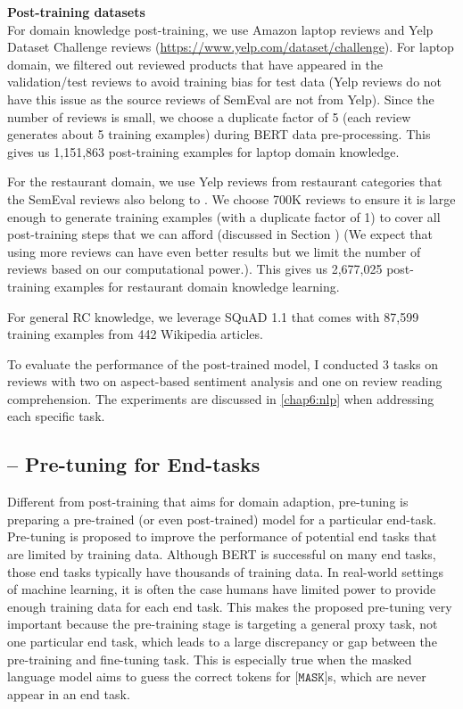 \textbf{Post-training datasets}\\
For domain knowledge post-training, we use Amazon laptop reviews \cite{HeMcA16a} and Yelp Dataset Challenge reviews (\url{https://www.yelp.com/dataset/challenge}).
For laptop domain, we filtered out reviewed products that have appeared in the validation/test reviews to avoid training bias for test data (Yelp reviews do not have this issue as the source reviews of SemEval are not from Yelp). 
Since the number of reviews is small, we choose a duplicate factor of 5 (each review generates about 5 training examples) during BERT data pre-processing.
This gives us 
1,151,863 post-training examples for laptop domain knowledge.

For the restaurant domain, we use Yelp reviews from restaurant categories that the SemEval reviews also belong to \cite{xu_acl2018}.
We choose 700K reviews to ensure it is large enough to generate training examples (with a duplicate factor of 1) to cover all post-training steps that we can afford (discussed in Section 
) (We expect that using more reviews can have even better results but we limit the number of reviews based on our computational power.).
This gives us 2,677,025 post-training examples for restaurant domain knowledge learning.

For general RC knowledge, we leverage SQuAD 1.1 \cite{rajpurkar2016squad} that comes with 87,599 training examples from 442 Wikipedia articles.

To evaluate the performance of the post-trained model, I conducted 3 tasks on reviews with two on aspect-based sentiment analysis and one on review reading comprehension.
The experiments are discussed in \ref{chap6:nlp} when addressing each specific task.

\subsection{-- Pre-tuning for End-tasks}
\label{chap4:sec:pre-tuning}

Different from post-training that aims for domain adaption, pre-tuning is preparing a pre-trained (or even post-trained) model for a particular end-task.
Pre-tuning is proposed to improve the performance of potential end tasks that are limited by training data.
Although BERT is successful on many end tasks, those end tasks typically have thousands of training data.
In real-world settings of machine learning, it is often the case humans have limited power to provide enough training data for each end task.
This makes the proposed pre-tuning very important because the pre-training stage is targeting a general proxy task, not one particular end task, which leads to a large discrepancy or gap between the pre-training and fine-tuning task.
This is especially true when the masked language model aims to guess the correct tokens for $\texttt{[MASK]}$s, which are never appear in an end task.

